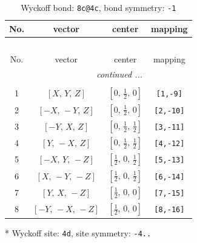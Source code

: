 \documentclass[fleqn,8pt]{jsarticle}
\begin{document}
\renewcommand{\arraystretch}{1.2}
\begin{longtable}{cccc}
\caption{Wyckoff bond: {\tt 8c@4c}, bond symmetry: {\tt -1}}
 \\
 \hline \hline
No. & vector & center & mapping \\ \hline \endfirsthead

\multicolumn{3}{l}{\tablename\ \thetable{}} \\
 \hline \hline
No. & vector & center & mapping \\ \hline \endhead

 \hline \hline
\multicolumn{3}{r}{\footnotesize\it continued ...} \\ \endfoot

 \hline \hline
\multicolumn{3}{r}{} \\ \endlastfoot

1 & $\left[ X,\, Y,\, Z \right]$ & $\left[ 0,\, \frac{1}{2},\, 0 \right]$ & {\tt [1,-9]} \\ \hline
2 & $\left[ - X,\, - Y,\, Z \right]$ & $\left[ 0,\, \frac{1}{2},\, 0 \right]$ & {\tt [2,-10]} \\ \hline
3 & $\left[ - Y,\, X,\, Z \right]$ & $\left[ 0,\, \frac{1}{2},\, \frac{1}{2} \right]$ & {\tt [3,-11]} \\ \hline
4 & $\left[ Y,\, - X,\, Z \right]$ & $\left[ 0,\, \frac{1}{2},\, \frac{1}{2} \right]$ & {\tt [4,-12]} \\ \hline
5 & $\left[ - X,\, Y,\, - Z \right]$ & $\left[ \frac{1}{2},\, 0,\, \frac{1}{2} \right]$ & {\tt [5,-13]} \\ \hline
6 & $\left[ X,\, - Y,\, - Z \right]$ & $\left[ \frac{1}{2},\, 0,\, \frac{1}{2} \right]$ & {\tt [6,-14]} \\ \hline
7 & $\left[ Y,\, X,\, - Z \right]$ & $\left[ \frac{1}{2},\, 0,\, 0 \right]$ & {\tt [7,-15]} \\ \hline
8 & $\left[ - Y,\, - X,\, - Z \right]$ & $\left[ \frac{1}{2},\, 0,\, 0 \right]$ & {\tt [8,-16]} \\
\end{longtable}
* Wyckoff site: {\tt 4d}, site symmetry: {\tt -4..}
\renewcommand{\arraystretch}{1.2}
\end{document}

